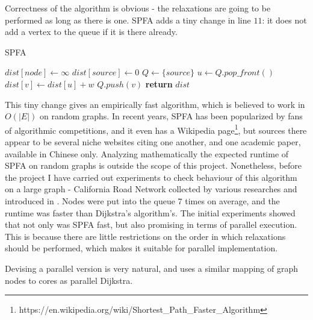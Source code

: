 \documentclass[12pt,a4paper,oneside,openright]{report}
\begin{document}
Correctness of the algorithm is obvious - the relaxations are going to be performed as long as there is one. SPFA adds a tiny change in line $11$: it does not add a vertex to the queue if it is there already.  

\begin{algorithm}
\caption{SPFA}\label{spfa}
\begin{algorithmic}[1]
    \State $dist[node] \gets \infty$
\EndFor
\State $dist[source] \gets 0$
\State $Q \gets \{source\}$ 
        \State $u \gets Q.pop\_front()$
            \State $dist[v] \gets dist[u] + w$
             
                \State $Q.push(v)$
                \EndIf
        \EndIf
      \EndFor
    \EndWhile
\State \textbf{return} $dist$
\EndProcedure
\end{algorithmic}
\end{algorithm}

This tiny change gives an empirically fast algorithm, which is believed to work in $O(|E|)$ on random graphs. In recent years, SPFA has been popularized by fans of algorithmic competitions, and it even has a Wikipedia page\footnote{https://en.wikipedia.org/wiki/Shortest\_Path\_Faster\_Algorithm}, but sources there appear to be several niche websites citing one another, and one academic paper, available in Chinese only. Analyzing mathematically the expected runtime of SPFA on random graphs is outside the scope of this project. Nonetheless, before the project I have carried out experiments to check behaviour of this algorithm on a large graph - California Road Network collected by various researches and introduced in \cite{CRN}. Nodes were put into the queue $7$ times on average, and the runtime was faster than Dijkstra's algorithm's. The initial experiments showed that not only was SPFA fast, but also promising in terms of parallel execution. This is because there are little restrictions on the order in which relaxations should be performed, which makes it suitable for parallel implementation.

Devising a parallel version is very natural, and uses a similar mapping of graph nodes to cores as parallel Dijkstra. 
\end{document}
